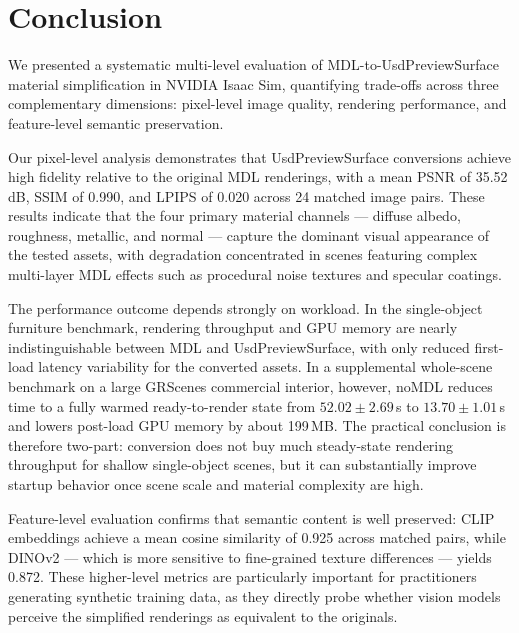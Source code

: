 \section{Conclusion}
\label{sec:conclusion}

We presented a systematic multi-level evaluation of MDL-to-UsdPreviewSurface
material simplification in NVIDIA Isaac Sim, quantifying trade-offs across
three complementary dimensions: pixel-level image quality, rendering performance,
and feature-level semantic preservation.

Our pixel-level analysis demonstrates that UsdPreviewSurface conversions
achieve high fidelity relative to the original MDL renderings, with a mean
PSNR of 35.52\,dB, SSIM of 0.990, and LPIPS of 0.020 across 24 matched image
pairs. These results indicate that the four primary material channels ---
diffuse albedo, roughness, metallic, and normal --- capture the dominant visual
appearance of the tested assets, with degradation concentrated in scenes
featuring complex multi-layer MDL effects such as procedural noise textures and
specular coatings.

The performance outcome depends strongly on workload. In the single-object
furniture benchmark, rendering throughput and GPU memory are nearly
indistinguishable between MDL and UsdPreviewSurface, with only reduced
first-load latency variability for the converted assets. In a supplemental
whole-scene benchmark on a large GRScenes commercial interior, however, noMDL
reduces time to a fully warmed ready-to-render state from
$52.02 \pm 2.69$\,s to $13.70 \pm 1.01$\,s and lowers post-load GPU memory by
about 199\,MB. The practical conclusion is therefore two-part: conversion does
not buy much steady-state rendering throughput for shallow single-object scenes,
but it can substantially improve startup behavior once scene scale and material
complexity are high.

Feature-level evaluation confirms that semantic content is well preserved:
CLIP embeddings achieve a mean cosine similarity of 0.925 across matched pairs,
while DINOv2 --- which is more sensitive to fine-grained texture differences ---
yields 0.872. These higher-level metrics are particularly important for
practitioners generating synthetic training data, as they directly probe
whether vision models perceive the simplified renderings as equivalent to the
originals.

